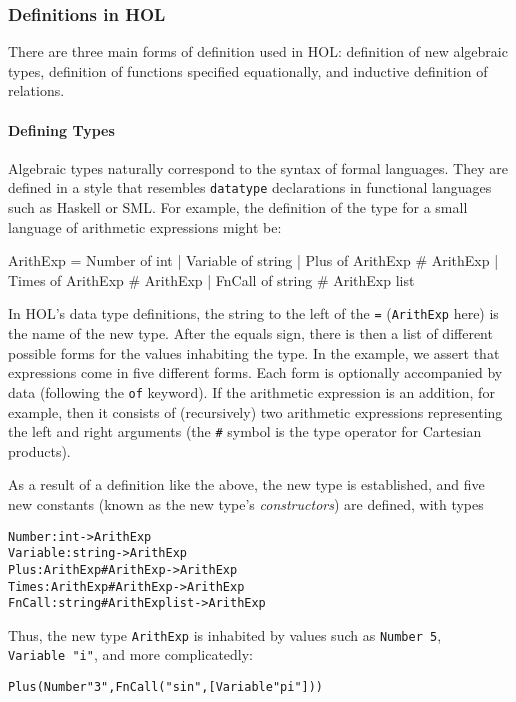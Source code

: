 \documentclass[11pt]{article}
\begin{document}
\subsubsection{Definitions in HOL}
There are three main forms of definition used in HOL: definition of
new algebraic types, definition of functions specified equationally,
and inductive definition of relations.

\paragraph{Defining Types}
Algebraic types naturally correspond to the syntax of formal
languages.  They are defined in a style that resembles
\texttt{datatype} declarations in functional languages such as Haskell
or SML.  For example, the definition of the type for a small language
of arithmetic expressions might be:
\begin{stdrule}
   ArithExp = Number of int
            | Variable of string
            | Plus of ArithExp # ArithExp
            | Times of ArithExp # ArithExp
            | FnCall of string # ArithExp list
\end{stdrule}
In HOL's data type definitions, the string to the left of the
\texttt{=} (\texttt{ArithExp} here) is the name of the new type.
After the equals sign, there is then a list of different possible
forms for the values inhabiting the type.  In the example, we assert
that expressions come in five different forms.  Each form is
optionally accompanied by data (following the \texttt{of} keyword).
If the arithmetic expression is an addition, for example, then it
consists of (recursively) two arithmetic expressions representing the
left and right arguments (the \texttt{\#} symbol is the type operator
for Cartesian products).

As a result of a definition like the above, the new type is
established, and five new constants (known as the new type's
\emph{constructors}) are defined, with types
\begin{alltt}
   Number   : int -> ArithExp
   Variable : string -> ArithExp
   Plus     : ArithExp # ArithExp -> ArithExp
   Times    : ArithExp # ArithExp -> ArithExp
   FnCall   : string # ArithExp list -> ArithExp
\end{alltt}
Thus, the new type \texttt{ArithExp} is inhabited by values such as
\texttt{Number~5}, \texttt{Variable~"i"}, and more complicatedly:
\begin{alltt}
   Plus (Number "3", FnCall ("sin", [Variable "pi"]))
\end{alltt}
\end{document}
